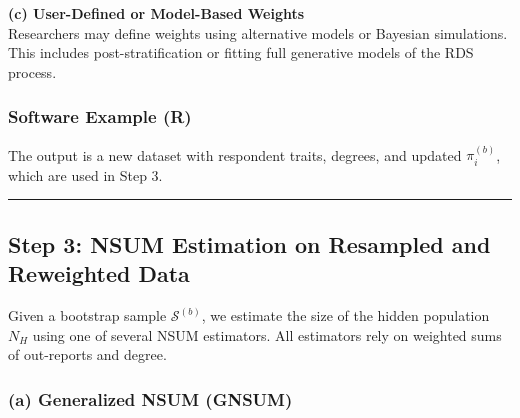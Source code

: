 \documentclass[
  12pt,
  letterpaper,
  DIV=11,
  numbers=noendperiod]{scrartcl}
\newenvironment{Shaded}{\begin{snugshade}}{\end{snugshade}}
\newcommand{\AttributeTok}[1]{\textcolor[rgb]{0.40,0.45,0.13}{#1}}
\newcommand{\DecValTok}[1]{\textcolor[rgb]{0.68,0.00,0.00}{#1}}
\newcommand{\FunctionTok}[1]{\textcolor[rgb]{0.28,0.35,0.67}{#1}}
\newcommand{\NormalTok}[1]{\textcolor[rgb]{0.00,0.23,0.31}{#1}}
\newcommand{\OtherTok}[1]{\textcolor[rgb]{0.00,0.23,0.31}{#1}}
\newcommand{\SpecialCharTok}[1]{\textcolor[rgb]{0.37,0.37,0.37}{#1}}
\newcommand{\StringTok}[1]{\textcolor[rgb]{0.13,0.47,0.30}{#1}}
\theoremstyle{plain}
\theoremstyle{definition}
\begin{document}
\textbf{(c) User-Defined or Model-Based Weights}\\
Researchers may define weights using alternative models or Bayesian
simulations. This includes post-stratification or fitting full
generative models of the RDS process.

\subsubsection{Software Example (R)}\label{software-example-r}

\begin{Shaded}
\end{Shaded}

The output is a new dataset with respondent traits, degrees, and updated
\(\pi_i^{(b)}\), which are used in Step 3.

\begin{center}\rule{0.5\linewidth}{0.5pt}\end{center}

\subsection{Step 3: NSUM Estimation on Resampled and Reweighted
Data}\label{step-3-nsum-estimation-on-resampled-and-reweighted-data}

Given a bootstrap sample \(\mathcal{S}^{(b)}\), we estimate the size of
the hidden population \(N_H\) using one of several NSUM estimators. All
estimators rely on weighted sums of out-reports and degree.

\subsubsection{(a) Generalized NSUM
(GNSUM)}\label{a-generalized-nsum-gnsum}
\end{document}

